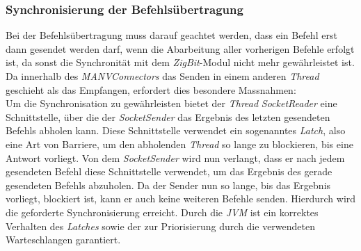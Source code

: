 \subsubsection{Synchronisierung der Befehlsübertragung}
Bei der Befehlsübertragung muss darauf geachtet werden, dass ein Befehl erst dann gesendet werden darf,
wenn die Abarbeitung aller vorherigen Befehle erfolgt ist, da sonst die Synchronität mit dem \emph{ZigBit}-Modul
nicht mehr gewährleistet ist. Da innerhalb des \emph{MANVConnectors} das Senden in einem anderen \emph{Thread} geschieht
als das Empfangen, erfordert dies besondere Massnahmen:\\
Um die Synchronisation zu gewährleisten bietet der \emph{Thread} \emph{SocketReader} eine Schnittstelle, über die der
\emph{SocketSender} das Ergebnis des letzten gesendeten Befehls abholen kann. Diese Schnittstelle verwendet ein sogenanntes
\emph{Latch}, also eine Art von Barriere, um den abholenden \emph{Thread} so lange zu blockieren, bis eine Antwort vorliegt.
Von dem \emph{SocketSender} wird nun verlangt, dass er nach jedem gesendeten Befehl diese Schnittstelle verwendet,
um das Ergebnis des gerade gesendeten Befehls abzuholen. Da der Sender nun so lange, bis das Ergebnis vorliegt, blockiert ist,
kann er auch keine weiteren Befehle senden. Hierdurch wird die geforderte Synchronisierung erreicht. Durch die \emph{JVM}
ist ein korrektes Verhalten des \emph{Latches} sowie der zur Priorisierung durch die verwendeten Warteschlangen garantiert.
